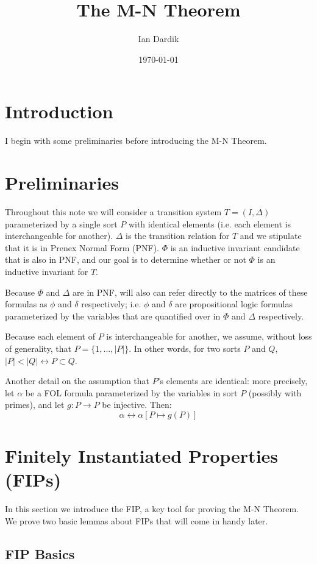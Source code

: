 \documentclass[12pt]{article}
\title{The M-N Theorem}
\author{Ian Dardik}
\date{\today}
\theoremstyle{definition}
\theoremstyle{remark}
\begin{document}
\maketitle

\section{Introduction}
I begin with some preliminaries before introducing the M-N Theorem.


\section{Preliminaries}
Throughout this note we will consider a transition system $T=(I,\Delta)$ parameterized by a single sort $P$ with identical elements (i.e. each element is interchangeable for another).  $\Delta$ is the transition relation for $T$ and we stipulate that it is in Prenex Normal Form (PNF).  $\Phi$ is an inductive invariant candidate that is also in PNF, and our goal is to determine whether or not $\Phi$ is an inductive invariant for $T$.

Because $\Phi$ and $\Delta$ are in PNF, will also can refer directly to the matrices of these formulas as $\phi$ and $\delta$ respectively; i.e. $\phi$ and $\delta$ are propositional logic formulas parameterized by the variables that are quantified over in $\Phi$ and $\Delta$ respectively.

Because each element of $P$ is interchangeable for another, we assume, without loss of generality, that $P = \{1,...,|P|\}$.  In other words, for two sorts $P$ and $Q$, $|P| < |Q| \leftrightarrow P \subset Q$.

Another detail on the assumption that $P$'s elements are identical: more precisely, let $\alpha$ be a FOL formula parameterized by the variables in sort $P$ (possibly with primes), and let $g : P \to P$ be injective.  Then:
$$\alpha \leftrightarrow \alpha[P \mapsto g(P)]$$


\section{Finitely Instantiated Properties (FIPs)}
In this section we introduce the FIP, a key tool for proving the M-N Theorem.  We prove two basic lemmas about FIPs that will come in handy later.

\subsection{FIP Basics}
\end{document}
